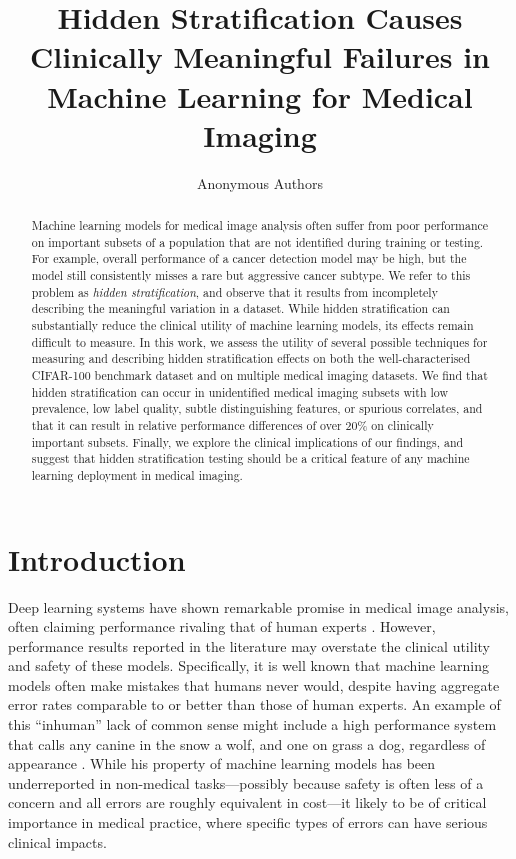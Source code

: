 \documentclass{article}
\title{Hidden Stratification Causes Clinically Meaningful Failures in Machine Learning for Medical Imaging
}
\author{%
Anonymous Authors
}
\begin{document}
\maketitle

\begin{abstract}
Machine learning models for medical image analysis often suffer from poor performance on important subsets of a population that are not identified during training or testing.
For example, overall performance of a cancer detection model may be high, but the model still consistently misses a rare but aggressive cancer subtype.    
We refer to this problem as \textit{hidden stratification}, and observe that it results from incompletely describing the meaningful variation in a dataset.
While hidden stratification can substantially reduce the clinical utility of machine learning models, its effects remain difficult to measure.
In this work, we assess the utility of several possible techniques for measuring and describing hidden stratification effects on both the well-characterised CIFAR-100 benchmark dataset and on multiple medical imaging datasets.
We find that hidden stratification can occur in unidentified medical imaging subsets with low prevalence, low label quality, subtle distinguishing features, or spurious correlates, and that it can result in relative performance differences of over 20\% on clinically important subsets.
Finally, we explore the clinical implications of our findings, and suggest that hidden stratification testing should be a critical feature of any machine learning deployment in medical imaging.

\end{abstract}

\section{Introduction}

Deep learning systems have shown remarkable promise in medical image analysis, often claiming performance rivaling that of human experts \citep{esteva2019guide}. 
 However, performance results reported in the literature may overstate the clinical utility and safety of these models.  
 Specifically, it is well known that machine learning models often make mistakes that humans never would, despite having aggregate error rates comparable to or better than those of human experts. An example of this ``inhuman'' lack of common sense might include a high performance system that calls any canine in the snow a wolf, and one on grass a dog, regardless of appearance \citep{ribeiro2016should}.
While his property of machine learning models has been underreported in non-medical tasks---possibly because safety is often less of a concern and all errors are roughly equivalent in cost---it likely to be of critical importance in medical practice, where specific types of errors can have serious clinical impacts. 
 
\end{document}
